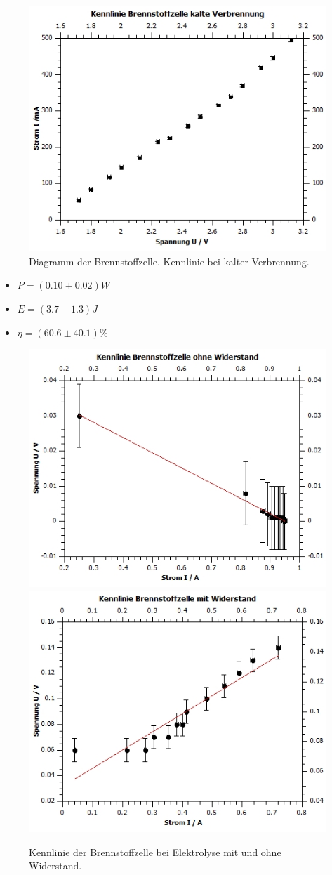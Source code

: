 \documentclass[12pt,a4paper,twoside]{article}
\begin{document}
\begin{figure}[H]
    \centering
    \includegraphics[width=0.6\linewidth]{nudes/brennstoff diagramm i-u.jpg}
    \caption{Diagramm der Brennstoffzelle. Kennlinie bei kalter Verbrennung.}
    \label{fig:zusammenfassung Brennstoffzelle kennlinie verbrennung}
\end{figure}

\begin{itemize}
    \item $P = (0.10 \pm 0.02)W$
    \item $E = (3.7 \pm 1.3)J$ 
    \item $\eta = (60.6 \pm 40.1)\%$
\end{itemize}

\begin{figure}[H]
    \centering
    \includegraphics[width=0.6\linewidth]{nudes/brennstoff diagramm ohne r.jpg}
    \includegraphics[width=0.6\linewidth]{nudes/brennstoff diagramm mit r.jpg}
    \caption{Kennlinie der Brennstoffzelle bei Elektrolyse mit und ohne Widerstand.}
    \label{fig:zusammenfassung Brennstoffzelle Widerstand}
\end{figure}
\end{document}
